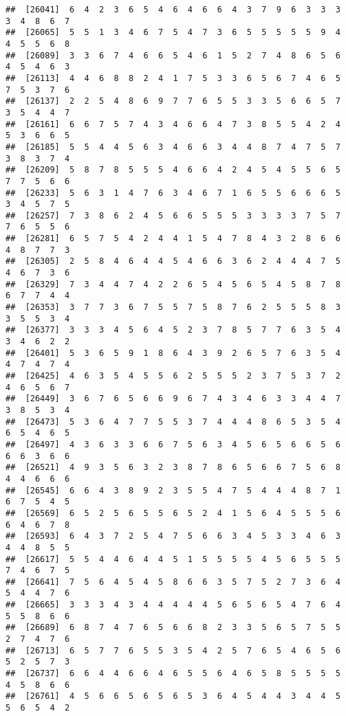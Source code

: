 \documentclass[
]{book}
\begin{document}
\begin{verbatim}
##  [26041]  6  4  2  3  6  5  4  6  4  6  6  4  3  7  9  6  3  3  3  3  4  8  6  7
##  [26065]  5  5  1  3  4  6  7  5  4  7  3  6  5  5  5  5  5  9  4  4  5  5  6  8
##  [26089]  3  3  6  7  4  6  6  5  4  6  1  5  2  7  4  8  6  5  6  4  5  4  6  3
##  [26113]  4  4  6  8  8  2  4  1  7  5  3  3  6  5  6  7  4  6  5  7  5  3  7  6
##  [26137]  2  2  5  4  8  6  9  7  7  6  5  5  3  3  5  6  6  5  7  3  5  4  4  7
##  [26161]  6  6  7  5  7  4  3  4  6  6  4  7  3  8  5  5  4  2  4  5  3  6  6  5
##  [26185]  5  5  4  4  5  6  3  4  6  6  3  4  4  8  7  4  7  5  7  3  8  3  7  4
##  [26209]  5  8  7  8  5  5  5  4  6  6  4  2  4  5  4  5  5  6  5  7  7  5  6  6
##  [26233]  5  6  3  1  4  7  6  3  4  6  7  1  6  5  5  6  6  6  5  3  4  5  7  5
##  [26257]  7  3  8  6  2  4  5  6  6  5  5  5  3  3  3  3  7  5  7  7  6  5  5  6
##  [26281]  6  5  7  5  4  2  4  4  1  5  4  7  8  4  3  2  8  6  6  4  8  7  7  3
##  [26305]  2  5  8  4  6  4  4  5  4  6  6  3  6  2  4  4  4  7  5  4  6  7  3  6
##  [26329]  7  3  4  4  7  4  2  2  6  5  4  5  6  5  4  5  8  7  8  6  7  7  4  4
##  [26353]  3  7  7  3  6  7  5  5  7  5  8  7  6  2  5  5  5  8  3  3  5  5  3  4
##  [26377]  3  3  3  4  5  6  4  5  2  3  7  8  5  7  7  6  3  5  4  3  4  6  2  2
##  [26401]  5  3  6  5  9  1  8  6  4  3  9  2  6  5  7  6  3  5  4  4  7  4  7  4
##  [26425]  4  6  3  5  4  5  5  6  2  5  5  5  2  3  7  5  3  7  2  4  6  5  6  7
##  [26449]  3  6  7  6  5  6  6  9  6  7  4  3  4  6  3  3  4  4  7  3  8  5  3  4
##  [26473]  5  3  6  4  7  7  5  5  3  7  4  4  4  8  6  5  3  5  4  6  5  4  6  5
##  [26497]  4  3  6  3  3  6  6  7  5  6  3  4  5  6  5  6  6  5  6  6  6  3  6  6
##  [26521]  4  9  3  5  6  3  2  3  8  7  8  6  5  6  6  7  5  6  8  4  4  6  6  6
##  [26545]  6  6  4  3  8  9  2  3  5  5  4  7  5  4  4  4  8  7  1  6  7  5  4  5
##  [26569]  6  5  2  5  6  5  5  6  5  2  4  1  5  6  4  5  5  5  6  6  4  6  7  8
##  [26593]  6  4  3  7  2  5  4  7  5  6  6  3  4  5  3  3  4  6  3  4  4  8  5  5
##  [26617]  5  5  4  4  6  4  4  5  1  5  5  5  5  4  5  6  5  5  5  7  4  6  7  5
##  [26641]  7  5  6  4  5  4  5  8  6  6  3  5  7  5  2  7  3  6  4  5  4  4  7  6
##  [26665]  3  3  3  4  3  4  4  4  4  4  5  6  5  6  5  4  7  6  4  5  5  8  6  6
##  [26689]  6  8  7  4  7  6  5  6  6  8  2  3  3  5  6  5  7  5  5  2  7  4  7  6
##  [26713]  6  5  7  7  6  5  5  3  5  4  2  5  7  6  5  4  6  5  6  5  2  5  7  3
##  [26737]  6  6  4  4  6  6  4  6  5  5  6  4  6  5  8  5  5  5  5  4  5  8  6  6
##  [26761]  4  5  6  6  5  6  5  6  5  3  6  4  5  4  4  3  4  4  5  5  6  5  4  2

\end{verbatim}
\end{document}
